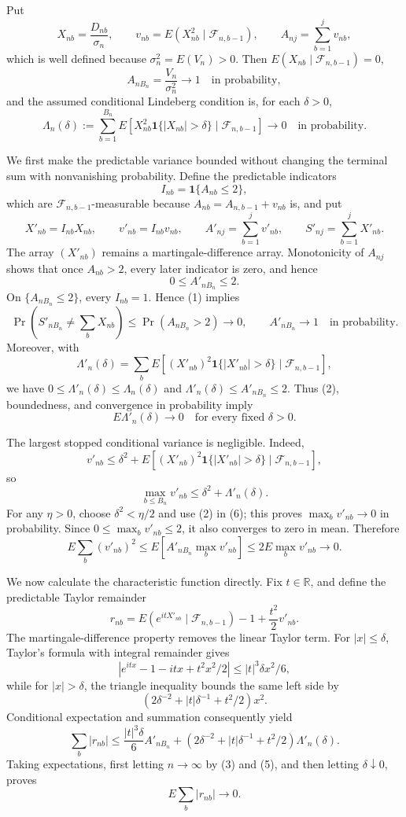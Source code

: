 Put
\[
X_{nb}=\frac{D_{nb}}{\sigma_n},\qquad
v_{nb}=E(X_{nb}^2\mid\mathcal F_{n,b-1}),\qquad
A_{nj}=\sum_{b=1}^{j}v_{nb},
\]
which is well defined because \(\sigma_n^2=E(V_n)>0\). Then \(E(X_{nb}\mid\mathcal F_{n,b-1})=0\),
\[
A_{nB_n}=\frac{V_n}{\sigma_n^2}\longrightarrow1
\quad\text{in probability},
\tag{1}
\]
and the assumed conditional Lindeberg condition is, for each \(\delta>0\),
\[
\Lambda_n(\delta):=\sum_{b=1}^{B_n}
E\!\left[X_{nb}^2\mathbf1\{|X_{nb}|>\delta\}\mid\mathcal F_{n,b-1}\right]
\longrightarrow0
\quad\text{in probability}.
\tag{2}
\]

We first make the predictable variance bounded without changing the terminal sum with nonvanishing probability. Define the predictable indicators
\[
I_{nb}=\mathbf1\{A_{nb}\le2\},
\]
which are \(\mathcal F_{n,b-1}\)-measurable because \(A_{nb}=A_{n,b-1}+v_{nb}\) is, and put
\[
X'_{nb}=I_{nb}X_{nb},\qquad
v'_{nb}=I_{nb}v_{nb},\qquad
A'_{nj}=\sum_{b=1}^{j}v'_{nb},\qquad
S'_{nj}=\sum_{b=1}^{j}X'_{nb}.
\]
The array \((X'_{nb})\) remains a martingale-difference array. Monotonicity of \(A_{nj}\) shows that once \(A_{nb}>2\), every later indicator is zero, and hence
\[
0\le A'_{nB_n}\le2.
\tag{3}
\]
On \(\{A_{nB_n}\le2\}\), every \(I_{nb}=1\). Hence (1) implies
\[
\Pr\!\left(S'_{nB_n}\ne\sum_bX_{nb}\right)
\le\Pr(A_{nB_n}>2)\longrightarrow0,
\qquad
A'_{nB_n}\longrightarrow1
\quad\text{in probability}.
\tag{4}
\]
Moreover, with
\[
\Lambda'_n(\delta)=\sum_bE\!\left[(X'_{nb})^2
\mathbf1\{|X'_{nb}|>\delta\}\mid\mathcal F_{n,b-1}\right],
\]
we have \(0\le\Lambda'_n(\delta)\le\Lambda_n(\delta)\) and \(\Lambda'_n(\delta)\le A'_{nB_n}\le2\). Thus (2), boundedness, and convergence in probability imply
\[
E\Lambda'_n(\delta)\longrightarrow0
\quad\text{for every fixed }\delta>0.
\tag{5}
\]

The largest stopped conditional variance is negligible. Indeed,
\[
v'_{nb}
\le \delta^2+E\!\left[(X'_{nb})^2
\mathbf1\{|X'_{nb}|>\delta\}\mid\mathcal F_{n,b-1}\right],
\]
so
\[
\max_{b\le B_n}v'_{nb}\le\delta^2+\Lambda'_n(\delta).
\tag{6}
\]
For any \(\eta>0\), choose \(\delta^2<\eta/2\) and use (2) in (6); this proves \(\max_bv'_{nb}\to0\) in probability. Since \(0\le\max_bv'_{nb}\le2\), it also converges to zero in mean. Therefore
\[
E\sum_b(v'_{nb})^2
\le E\!\left[A'_{nB_n}\max_bv'_{nb}\right]
\le2E\max_bv'_{nb}\longrightarrow0.
\tag{7}
\]

We now calculate the characteristic function directly. Fix \(t\in\mathbb R\), and define the predictable Taylor remainder
\[
r_{nb}=E(e^{itX'_{nb}}\mid\mathcal F_{n,b-1})-1+\frac{t^2}{2}v'_{nb}.
\]
The martingale-difference property removes the linear Taylor term. For \(|x|\le\delta\), Taylor's formula with integral remainder gives
\[
|e^{itx}-1-itx+t^2x^2/2|\le |t|^3\delta x^2/6,
\]
while for \(|x|>\delta\), the triangle inequality bounds the same left side by
\[
\left(2\delta^{-2}+|t|\delta^{-1}+t^2/2\right)x^2.
\]
Conditional expectation and summation consequently yield
\[
\sum_b|r_{nb}|
\le \frac{|t|^3\delta}{6}A'_{nB_n}
+\left(2\delta^{-2}+|t|\delta^{-1}+t^2/2\right)\Lambda'_n(\delta).
\tag{8}
\]
Taking expectations, first letting \(n\to\infty\) by (3) and (5), and then letting \(\delta\downarrow0\), proves
\[
E\sum_b|r_{nb}|\longrightarrow0.
\tag{9}
\]

